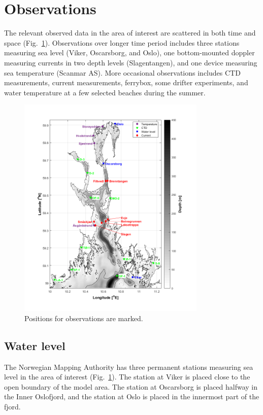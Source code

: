 \section{Observations}

The relevant observed data in the area of interest are scattered in both time and space (Fig.~\ref{fig:kart_obs}). Observations over longer time period includes three stations measuring sea level (Viker, Oscarsborg, and Oslo), one bottom-mounted doppler measuring currents in two depth levels (Slagentangen), and one device measuring sea temperature (Scanmar AS). More occasional observations includes CTD measurements, current measurements, ferrybox, some drifter experiments, and water temperature at a few selected beaches during the summer.  

\begin{figure}[htb]
\centerline{
\includegraphics*[trim=0cm 0.8cm 0cm 0cm,clip=true,width=0.8\textwidth]{Figurer/kart_obs}
}
\caption{\small
Positions for observations are marked.
}
\label{fig:kart_obs}
\end{figure}

\newpage

\subsection{Water level}
The Norwegian Mapping Authority has three permanent stations measuring sea level in the area of interest (Fig.~\ref{fig:kart_obs}). The station at Viker is placed close to the open boundary of the model area. The station at Oscarsborg is placed halfway in the Inner Oslofjord, and the station at Oslo is placed in the innermost part of the fjord.

